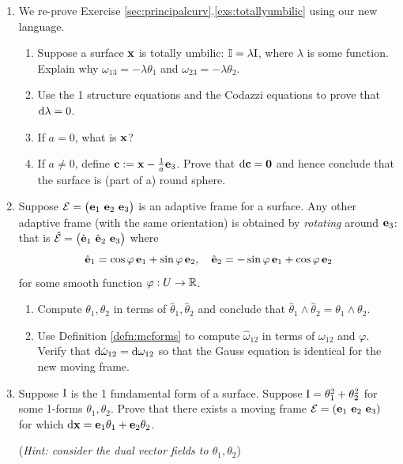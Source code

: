 \begin{exercises}{}{}
\begin{enumerate}
  
		\item We re-prove Exercise \ref*{sec:principalcurv}.\ref{exs:totallyumbilic} using our new language.
		\begin{enumerate}
		  \item Suppose a surface ${\mathbf{x}}$ is totally umbilic: $\mathbb{I}=\lambda\mathrm{I}$, where $\lambda$ is some function. Explain why $\omega_{13}=-\lambda\theta_1$ and $\omega_{23}=-\lambda\theta_2$. 
		  \item Use the 1\st{} structure equations and the Codazzi equations to prove that $\mathrm{d}\lambda=0$.
			\item If $a=0$, what is ${\mathbf{x}}$?
			\item If $a\neq 0$, define $\mathbf{c}:={\mathbf{x}}-\frac 1a{\mathbf{e}}_3$. Prove that $\mathrm{d}\mathbf{c}=\mathbf{0}$ and hence conclude that the surface is (part of a) round sphere.
		\end{enumerate}
	

		\item Suppose $\cE=\bigl(\ve_1\ \ve_2\ \ve_3\bigr)$ is an adaptive frame for a surface. Any other adaptive frame (with the same orientation) is obtained by \emph{rotating} around ${\mathbf{e}}_3$: that is $\hat{\cE}=\bigl(\hat\ve_1\ \hat\ve_2\ \ve_3\bigr)$ where
		\[
			\hat{{\mathbf{e}}}_1=\cos\varphi\,{\mathbf{e}}_1+\sin\varphi\,{\mathbf{e}}_2,\quad \hat{{\mathbf{e}}}_2=-\sin\varphi\,{\mathbf{e}}_1+\cos\varphi\,{\mathbf{e}}_2
		\]
 	  for some smooth function $\varphi:U\to\mathbb{R}$.
 	  \begin{enumerate}
 	    \item Compute $\theta_1,\theta_2$ in terms of $\hat\theta_1,\hat\theta_2$ and conclude that $\hat\theta_1\wedge\hat\theta_2=\theta_1\wedge\theta_2$.
 	    \item Use Definition \ref{defn:mcforms} to compute $\hat\omega_{12}$ in terms of $\omega_{12}$ and $\varphi$. Verify that $\mathrm{d}\hat\omega_{12}=\mathrm{d}\omega_{12}$ so that the Gauss equation is identical for the new moving frame.
 	  \end{enumerate}
  

		\goodbreak
  
  
  	\item Suppose $\mathrm{I}$ is the 1\st{} fundamental form of a surface. Suppose $\mathrm{I}=\theta_1^2+\theta_2^2$ for some 1-forms $\theta_1,\theta_2$. Prove that there exists a moving frame $\mathcal{E}=({\mathbf{e}}_1\ {\mathbf{e}}_2\ {\mathbf{e}}_3)$ for which $\mathrm{d}{\mathbf{x}}={\mathbf{e}}_1\theta_1+{\mathbf{e}}_2\theta_2$.\par
  	(\emph{Hint: consider the dual vector fields to $\theta_1,\theta_2$})
  

\end{enumerate}
\end{exercises}
